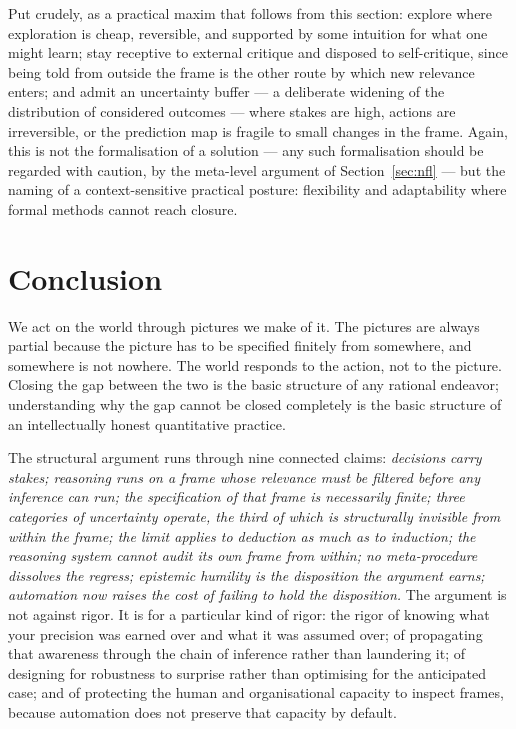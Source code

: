 \documentclass[11pt,a4paper]{article}
\begin{document}
Put crudely, as a practical maxim that follows from this section:
explore where exploration is cheap, reversible, and supported by some
intuition for what one might learn; stay receptive to external critique
and disposed to self-critique, since being told from outside the frame
is the other route by which new relevance enters; and admit an
uncertainty buffer --- a deliberate widening of the distribution of
considered outcomes --- where stakes are high, actions are
irreversible, or the prediction map is fragile to small changes in the
frame. Again, this is not the formalisation of a solution --- any such
formalisation should be regarded with caution, by the meta-level
argument of Section~\ref{sec:nfl} --- but the naming of a
context-sensitive practical posture: flexibility and adaptability where
formal methods cannot reach closure.

\section{Conclusion}
\label{sec:conclusion}

We act on the world through pictures we make of it. The pictures are
always partial because the picture has to be specified finitely from
somewhere, and somewhere is not nowhere. The world responds to the
action, not to the picture. Closing the gap between the two is the basic
structure of any rational endeavor; understanding why the gap cannot be
closed completely is the basic structure of an intellectually honest
quantitative practice.

The structural argument runs through nine connected claims:
\emph{decisions carry stakes; reasoning runs on a frame whose relevance
must be filtered before any inference can run; the specification of that
frame is necessarily finite; three categories of uncertainty operate, the
third of which is structurally invisible from within the frame; the limit
applies to deduction as much as to induction; the reasoning system cannot
audit its own frame from within; no meta-procedure dissolves the regress; 
epistemic humility is the disposition the argument earns;
automation now raises the cost of failing to hold the disposition.}
The argument is not against rigor. It
is for a particular kind of rigor: the rigor of knowing what your
precision was earned over and what it was assumed over; of propagating
that awareness through the chain of inference rather than laundering it;
of designing for robustness to surprise rather than optimising for the
anticipated case; and of protecting the human and organisational
capacity to inspect frames, because automation does not preserve that
capacity by default.
\end{document}
